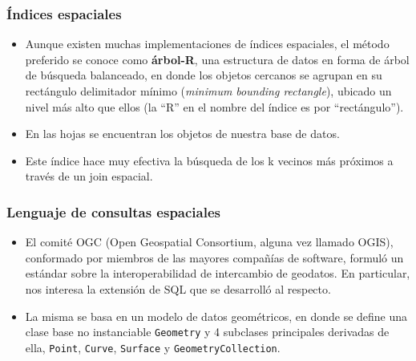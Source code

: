\begin{frame}
\frametitle{Índices espaciales}
\begin{itemize}
	\item	Aunque existen muchas implementaciones de índices espaciales,
		el método preferido se conoce como {\bf árbol-R}, una estructura
		de datos en forma de árbol de búsqueda balanceado, en donde los
		objetos cercanos se agrupan en su rectángulo delimitador mínimo
		({\it minimum bounding rectangle}), ubicado un nivel más alto que
		ellos (la ``R'' en el nombre del índice es por ``rectángulo'').
		\pause

	\item	En las hojas se encuentran los objetos de nuestra base de datos. \pause

	\item	Este índice hace muy efectiva la búsqueda de los k vecinos más próximos
		a través de un join espacial.
\end{itemize}
\end{frame}

\begin{frame}
\frametitle{Lenguaje de consultas espaciales}
\begin{itemize}
	\item	El comité OGC (Open Geospatial Consortium, alguna vez llamado OGIS),
		conformado por miembros de las mayores compañías de software, formuló
		un estándar sobre la interoperabilidad de intercambio de geodatos. En
		particular, nos interesa la extensión de SQL que se desarrolló al
		respecto. \pause

	\item	La misma se basa en un modelo de datos geométricos, en donde se
		define una clase base no instanciable \texttt{Geometry} y 4 subclases
		principales derivadas de ella, \texttt{Point}, \texttt{Curve},
		\texttt{Surface} y \texttt{GeometryCollection}.
\end{itemize}
\end{frame}


